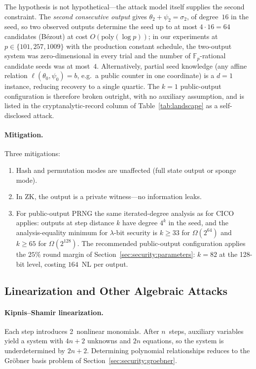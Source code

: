 \documentclass[11pt,a4paper]{article}
\theoremstyle{definition}
\newcommand{\Fp}{\mathbb{F}_p}
\begin{document}
\noindent
The hypothesis is not hypothetical---the attack model itself supplies
the second constraint. The \emph{second consecutive output} gives
$\theta_2 + \psi_2 = \sigma_2$, of degree~$16$ in the seed, so two
observed outputs determine the seed up to at most
$4 \cdot 16 = 64$ candidates (B\'ezout) at cost
$O(\mathrm{poly}(\log p))$; in our experiments at
$p \in \{101, 257, 1009\}$ with the production constant schedule, the
two-output system was zero-dimensional in every trial and the number
of $\Fp$-rational candidate seeds was at most~$4$. Alternatively,
partial seed knowledge (any affine relation
$\ell(\theta_0, \psi_0) = b$, e.g.\ a public counter in one
coordinate) is a $d = 1$ instance, reducing recovery to a single
quartic. The $k=1$ public-output configuration is therefore broken
outright, with no auxiliary assumption, and is listed in the
cryptanalytic-record column of Table~\ref{tab:landscape} as a
self-disclosed attack.

\paragraph{Mitigation.}
Three mitigations:
\begin{enumerate}[nosep]
  \item Hash and permutation modes are unaffected (full state output or
        sponge mode).
  \item In ZK, the output is a private witness---no information leaks.
  \item For public-output PRNG the same iterated-degree analysis as
        for CICO applies: outputs at step distance $k$ have degree
        $4^{k}$ in the seed, and the analysis-equality minimum for
        $\lambda$-bit security is $k \ge 33$ for
        $\Omega(2^{64})$ and $k \ge 65$ for $\Omega(2^{128})$. The
        recommended public-output configuration applies the $25\%$
        round margin of Section~\ref{sec:security:parameters}:
        $k = 82$ at the 128-bit level, costing $164$~NL per output.
\end{enumerate}


\subsection{Linearization and Other Algebraic Attacks}\label{sec:security:linearization}

\paragraph{Kipnis--Shamir linearization.}
Each step introduces 2~nonlinear monomials. After $n$~steps, auxiliary
variables yield a system with $4n+2$ unknowns and $2n$ equations, so
the system is underdetermined by $2n+2$. Determining polynomial
relationships reduces to the Gr\"obner basis problem of
Section~\ref{sec:security:groebner}.
\end{document}
